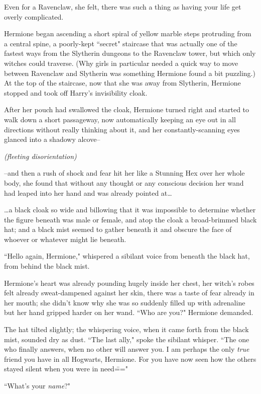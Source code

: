 Even for a Ravenclaw, she felt, there was such a thing as having your life get overly complicated.

Hermione began ascending a short spiral of yellow marble steps protruding from a central spine, a poorly-kept ``secret" staircase that was actually one of the fastest ways from the Slytherin dungeons to the Ravenclaw tower, but which only witches could traverse. (Why girls in particular needed a quick way to move between Ravenclaw and Slytherin was something Hermione found a bit puzzling.) At the top of the staircase, now that she was away from Slytherin, Hermione stopped and took off Harry's invisibility cloak.

After her pouch had swallowed the cloak, Hermione turned right and started to walk down a short passageway, now automatically keeping an eye out in all directions without really thinking about it, and her constantly-scanning eyes glanced into a shadowy alcove\---

\emph{(fleeting disorientation)}

\---and then a rush of shock and fear hit her like a Stunning Hex over her whole body, she found that without any thought or any conscious decision her wand had leaped into her hand and was already pointed at{\ldots}

{\ldots}a black cloak so wide and billowing that it was impossible to determine whether the figure beneath was male or female, and atop the cloak a broad-brimmed black hat; and a black mist seemed to gather beneath it and obscure the face of whoever or whatever might lie beneath.

``Hello again, Hermione," whispered a sibilant voice from beneath the black hat, from behind the black mist.

Hermione's heart was already pounding hugely inside her chest, her witch's robes felt already sweat-dampened against her skin, there was a taste of fear already in her mouth; she didn't know why she was so suddenly filled up with adrenaline but her hand gripped harder on her wand. ``Who are you?" Hermione demanded.

The hat tilted slightly; the whispering voice, when it came forth from the black mist, sounded dry as dust. ``The last ally," spoke the sibilant whisper. ``The one who finally answers, when no other will answer you. I am perhaps the only \emph{true} friend you have in all Hogwarts, Hermione. For you have now seen how the others stayed silent when you were in need\==="

``What's your \emph{name}?"

